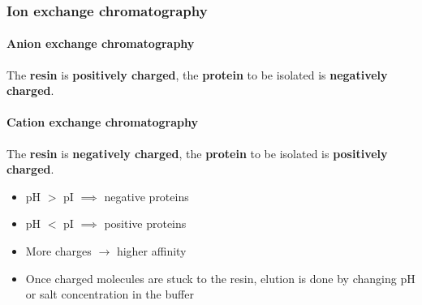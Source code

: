 \documentclass[letterpaper, 12pt]{article}
\begin{document}
\subsubsection*{Ion exchange chromatography}

\paragraph{Anion exchange chromatography} The \textbf{resin} is \textbf{positively charged}, the \textbf{protein} to be isolated is \textbf{negatively charged}.

\paragraph{Cation exchange chromatography} The \textbf{resin} is \textbf{negatively charged}, the \textbf{protein} to be isolated is \textbf{positively charged}.

\begin{itemize}
\item pH $>$ pI $\implies$ negative proteins
\item pH $<$ pI $\implies$ positive proteins
\item More charges $\to$ higher affinity
\item Once charged molecules are stuck to the resin, elution is done by changing pH or salt concentration in the buffer
\end{itemize}
\end{document}
